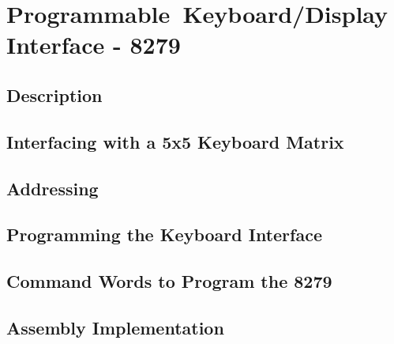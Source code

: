 \section{Programmable Keyboard/Display Interface - 8279}

    \subsection{Description}

    \subsection{Interfacing with a 5x5 Keyboard Matrix}

    \subsection{Addressing}

    \subsection{Programming the Keyboard Interface}

    \subsection{Command Words to Program the 8279}

    \subsection{Assembly Implementation}
